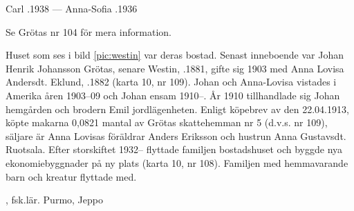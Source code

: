 Carl .1938  ---  Anna-Sofia .1936


Se Grötas nr 104 för mera information.\jhvspace{}





Huset som ses i bild \ref{pic:westin} var deras bostad. Senast inneboende var Johan Henrik Johansson Grötas, senare Westin, .1881, gifte sig 1903 med Anna Lovisa Andersdt. Eklund, .1882 (karta 10, nr 109). Johan och Anna-Lovisa vistades i Amerika åren 1903--09 och Johan ensam 1910--. År 1910 tillhandlade sig Johan hemgården och brodern Emil jordlägenheten. Enligt köpebrev av den 22.04.1913, köpte makarna 0,0821 mantal av Grötas skattehemman nr 5 (d.v.s. nr 109), säljare är Anna Lovisas föräldrar Anders Eriksson och hustrun Anna Gustavsdt. Ruotsala. Efter storskiftet 1932-- flyttade familjen bostadshuset och byggde nya ekonomiebyggnader på ny plats (karta 10, nr 108). Familjen med hemmavarande barn och kreatur flyttade med.
\begin{jhchildren}
  \item {}, fsk.lär. Purmo, Jeppo
  \item {}
  \item {}
  \item {}
  \item {}
  \item {}
  \item {}
  \item {}
  \item {}
  \item {}
\end{jhchildren}


